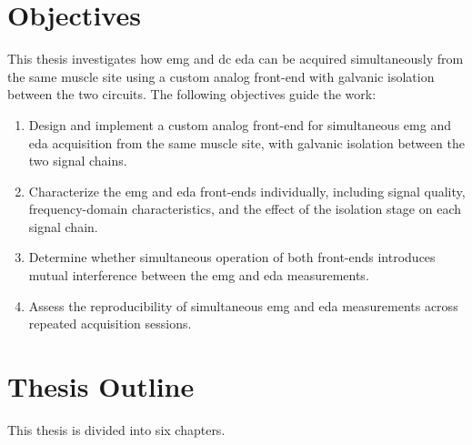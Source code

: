 \section{Objectives}
This thesis investigates how \gls{emg} and \gls{dc} \gls{eda} can be acquired simultaneously from the same muscle site using a custom analog front-end with galvanic isolation between the two circuits.
The following objectives guide the work:

\begin{enumerate}
    \item Design and implement a custom analog front-end for simultaneous \gls{emg} and \gls{eda} acquisition from the same muscle site, with galvanic isolation between the two signal chains.
    \item Characterize the \gls{emg} and \gls{eda} front-ends individually, including signal quality, frequency-domain characteristics, and the effect of the isolation stage on each signal chain.
    \item Determine whether simultaneous operation of both front-ends introduces mutual interference between the \gls{emg} and \gls{eda} measurements.
    \item Assess the reproducibility of simultaneous \gls{emg} and \gls{eda} measurements across repeated acquisition sessions.
\end{enumerate}


\section{Thesis Outline}
This thesis is divided into six chapters.

